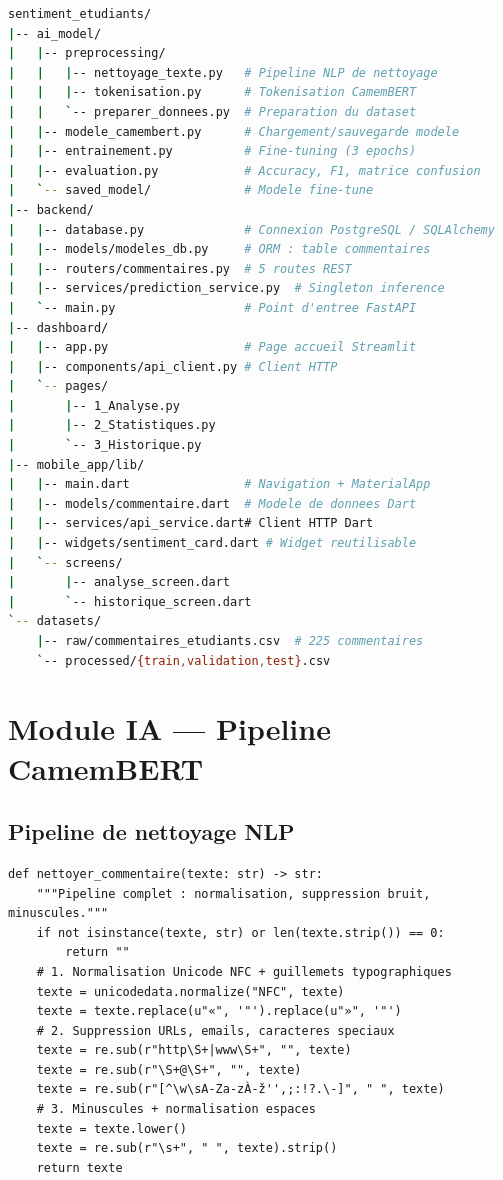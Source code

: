 \documentclass[12pt,a4paper,oneside]{report}
\begin{document}
\begin{lstlisting}[language=bash,caption={Structure complète du projet},
  basicstyle=\ttfamily\footnotesize,frame=single,
  backgroundcolor=\color{griscode},numbers=none,xleftmargin=0.5cm]
sentiment_etudiants/
|-- ai_model/
|   |-- preprocessing/
|   |   |-- nettoyage_texte.py   # Pipeline NLP de nettoyage
|   |   |-- tokenisation.py      # Tokenisation CamemBERT
|   |   `-- preparer_donnees.py  # Preparation du dataset
|   |-- modele_camembert.py      # Chargement/sauvegarde modele
|   |-- entrainement.py          # Fine-tuning (3 epochs)
|   |-- evaluation.py            # Accuracy, F1, matrice confusion
|   `-- saved_model/             # Modele fine-tune
|-- backend/
|   |-- database.py              # Connexion PostgreSQL / SQLAlchemy
|   |-- models/modeles_db.py     # ORM : table commentaires
|   |-- routers/commentaires.py  # 5 routes REST
|   |-- services/prediction_service.py  # Singleton inference
|   `-- main.py                  # Point d'entree FastAPI
|-- dashboard/
|   |-- app.py                   # Page accueil Streamlit
|   |-- components/api_client.py # Client HTTP
|   `-- pages/
|       |-- 1_Analyse.py
|       |-- 2_Statistiques.py
|       `-- 3_Historique.py
|-- mobile_app/lib/
|   |-- main.dart                # Navigation + MaterialApp
|   |-- models/commentaire.dart  # Modele de donnees Dart
|   |-- services/api_service.dart# Client HTTP Dart
|   |-- widgets/sentiment_card.dart # Widget reutilisable
|   `-- screens/
|       |-- analyse_screen.dart
|       `-- historique_screen.dart
`-- datasets/
    |-- raw/commentaires_etudiants.csv  # 225 commentaires
    `-- processed/{train,validation,test}.csv
\end{lstlisting}

\section{Module IA --- Pipeline CamemBERT}

\subsection{Pipeline de nettoyage NLP}

\begin{lstlisting}[style=stylePython,caption={Pipeline de nettoyage du texte},label={lst:nettoyage}]
def nettoyer_commentaire(texte: str) -> str:
    """Pipeline complet : normalisation, suppression bruit, minuscules."""
    if not isinstance(texte, str) or len(texte.strip()) == 0:
        return ""
    # 1. Normalisation Unicode NFC + guillemets typographiques
    texte = unicodedata.normalize("NFC", texte)
    texte = texte.replace(u"«", '"').replace(u"»", '"')
    # 2. Suppression URLs, emails, caracteres speciaux
    texte = re.sub(r"http\S+|www\S+", "", texte)
    texte = re.sub(r"\S+@\S+", "", texte)
    texte = re.sub(r"[^\w\sA-Za-zÀ-ž'',;:!?.\-]", " ", texte)
    # 3. Minuscules + normalisation espaces
    texte = texte.lower()
    texte = re.sub(r"\s+", " ", texte).strip()
    return texte
\end{lstlisting}
\end{document}
